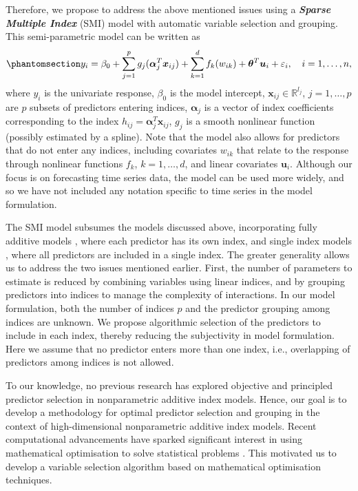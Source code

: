 \documentclass[
  11pt,
  a4paper,
]{article}
\begin{document}
Therefore, we propose to address the above mentioned issues using a
\textbf{\emph{Sparse Multiple Index}} (SMI) model with automatic
variable selection and grouping. This semi-parametric model can be
written as \begin{equation}\phantomsection\label{eq-semipara}{
  y_{i} = \beta_{0} + \sum_{j = 1}^{p}g_{j}(\bm{\alpha}_{j}^{T}\bm{x}_{ij}) + \sum_{k = 1}^{d}f_{k}(w_{ik}) + \bm{\theta}^{T}\bm{u}_{i} + \varepsilon_{i}, \quad i = 1, \dots, n,
}\end{equation} where \(y_{i}\) is the univariate response,
\(\beta_{0}\) is the model intercept,
\(\bm{x}_{ij} \in \mathbb{R}^{l_{j}}\), \(j = 1, \dots, p\) are \(p\)
subsets of predictors entering indices, \(\bm{\alpha}_{j}\) is a vector
of index coefficients corresponding to the index
\(h_{ij} = \bm{\alpha}_{j}^{T}\bm{x}_{ij}\), \(g_{j}\) is a smooth
nonlinear function (possibly estimated by a spline). Note that the model
also allows for predictors that do not enter any indices, including
covariates \(w_{ik}\) that relate to the response through nonlinear
functions \(f_{k}\), \(k = 1, \dots, d\), and linear covariates
\(\bm{u}_{i}\). Although our focus is on forecasting time series data,
the model can be used more widely, and so we have not included any
notation specific to time series in the model formulation.

The SMI model subsumes the models discussed above, incorporating fully
additive models \autocite{Wood2011,Wood2017}, where each predictor has
its own index, and single index models
\autocite{Stoker1986,Hardle1993,Radchenko2015}, where all predictors are
included in a single index. The greater generality allows us to address
the two issues mentioned earlier. First, the number of parameters to
estimate is reduced by combining variables using linear indices, and by
grouping predictors into indices to manage the complexity of
interactions. In our model formulation, both the number of indices \(p\)
and the predictor grouping among indices are unknown. We propose
algorithmic selection of the predictors to include in each index,
thereby reducing the subjectivity in model formulation. Here we assume
that no predictor enters more than one index, i.e., overlapping of
predictors among indices is not allowed.

To our knowledge, no previous research has explored objective and
principled predictor selection in nonparametric additive index models.
Hence, our goal is to develop a methodology for optimal predictor
selection and grouping in the context of high-dimensional nonparametric
additive index models. Recent computational advancements have sparked
significant interest in using mathematical optimisation to solve
statistical problems \autocite{Theusl2020}. This motivated us to develop
a variable selection algorithm based on mathematical optimisation
techniques.
\end{document}
